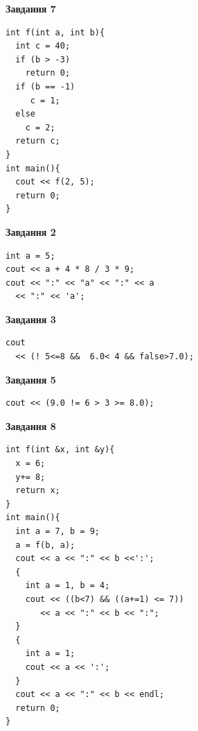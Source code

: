 \documentclass[12pt, ukrainian]{article}
\begin{document}
{\begin {large}
\begin{minipage}[t]{7.0cm}
\begin{center}
\textbf{Завдання 7}
\end{center}
\vspace{-8mm}

\begin{verbatim}
int f(int a, int b){
  int c = 40;
  if (b > -3)
    return 0;
  if (b == -1)
     c = 1;
  else
    c = 2;
  return c;
}
int main(){
  cout << f(2, 5);
  return 0;
}
\end{verbatim}

\end{minipage}
\vline \hspace{1mm}
\begin{minipage}[t]{11.0cm}

\begin{center}
\textbf{Завдання 2}
\end{center}
\vspace{-8mm}

\begin{verbatim}
int a = 5;
cout << a + 4 * 8 / 3 * 9;
cout << ":" << "a" << ":" << a 
  << ":" << 'a';
\end{verbatim}



\begin{center}
\textbf{Завдання 3}
\end{center}
\vspace{-8mm}

\begin{verbatim}
cout 
  << (! 5<=8 &&  6.0< 4 && false>7.0);
\end{verbatim}



\begin{center}
\textbf{Завдання 5}
\end{center}
\vspace{-8mm}

\begin{verbatim}
cout << (9.0 != 6 > 3 >= 8.0);
\end{verbatim}



\begin{center}
\textbf{Завдання 8}
\end{center}
\vspace{-8mm}

\begin{verbatim}
int f(int &x, int &y){
  x = 6;
  y+= 8;
  return x;
}
int main(){
  int a = 7, b = 9;
  a = f(b, a);
  cout << a << ":" << b <<':';
  {
    int a = 1, b = 4;
    cout << ((b<7) && ((a+=1) <= 7))
       << a << ":" << b << ":";
  }
  {
    int a = 1;
    cout << a << ':';
  }
  cout << a << ":" << b << endl;
  return 0;
}
\end{verbatim}


\end{minipage}
\end{large}}
\end{document}
